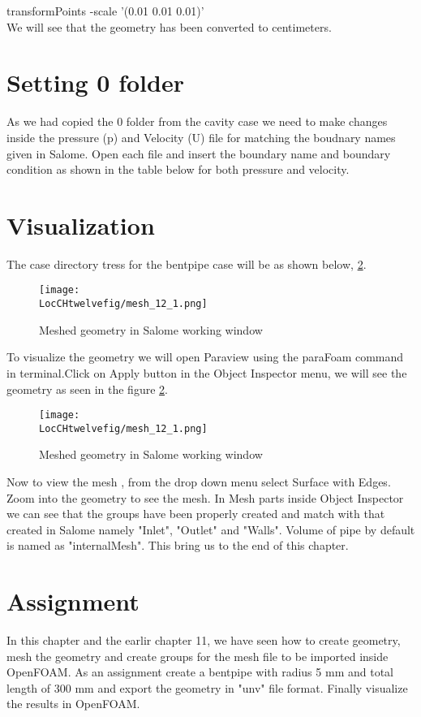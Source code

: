 transformPoints -scale '(0.01 0.01 0.01)' \\

We will see that the geometry has been converted to centimeters.

\section{Setting 0 folder}

As we had copied the 0 folder from the cavity case we need to make changes inside the pressure (p) and Velocity (U) file for matching the boudnary names given in Salome. Open each file and insert the boundary name and boundary condition as shown in the table below for both pressure and velocity.


\section{Visualization}

The case directory tress for the bentpipe case will be as shown below, \ref{mesh_1}.

\begin{figure}[h]  
\centering
\texttt{[image: \\LocCHtwelvefig/mesh\_12\_1.png]}
\caption{Meshed geometry in Salome working window}
\label{mesh_1}
\end{figure}

To visualize the geometry we will open Paraview using the paraFoam command in terminal.Click on Apply button in the Object Inspector menu, we will see the geometry as seen in the figure \ref{mesh_1}.

\begin{figure}[h]  
\centering
\texttt{[image: \\LocCHtwelvefig/mesh\_12\_1.png]}
\caption{Meshed geometry in Salome working window}
\label{mesh_1}
\end{figure}

Now to view the mesh , from the drop down menu select Surface with Edges. Zoom into the geometry to see the mesh. In Mesh parts inside Object Inspector we can see that the groups have been properly created and match with that created in Salome namely "Inlet", "Outlet" and "Walls". Volume of pipe by default is named as "internalMesh". This bring us to the end of this chapter.

\section{Assignment}

In this chapter and the earlir chapter 11, we have seen how to create geometry, mesh the geometry and create groups for the mesh file to be imported inside OpenFOAM. As an assignment create a bentpipe with radius 5 mm and total length of 300 mm and export the geometry in "unv" file format. Finally visualize the results in OpenFOAM.

